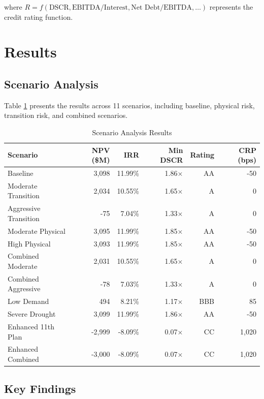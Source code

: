 \documentclass[11pt,a4paper]{article}
\begin{document}
where $R = f(\text{DSCR}, \text{EBITDA/Interest}, \text{Net Debt/EBITDA}, \dots)$ represents the credit rating function.

\section{Results}

\subsection{Scenario Analysis}

Table \ref{tab:scenarios} presents the results across 11 scenarios, including baseline, physical risk, transition risk, and combined scenarios.

\begin{table}[htbp]
\centering
\caption{Scenario Analysis Results}
\label{tab:scenarios}
\begin{tabular}{lrrrrr}
\toprule
\textbf{Scenario} & \textbf{NPV (\$M)} & \textbf{IRR} & \textbf{Min DSCR} & \textbf{Rating} & \textbf{CRP (bps)} \\
\midrule
Baseline & 3,098 & 11.99\% & 1.86× & AA & -50 \\
Moderate Transition & 2,034 & 10.55\% & 1.65× & A & 0 \\
Aggressive Transition & -75 & 7.04\% & 1.33× & A & 0 \\
Moderate Physical & 3,095 & 11.99\% & 1.85× & AA & -50 \\
High Physical & 3,093 & 11.99\% & 1.85× & AA & -50 \\
Combined Moderate & 2,031 & 10.55\% & 1.65× & A & 0 \\
Combined Aggressive & -78 & 7.03\% & 1.33× & A & 0 \\
Low Demand & 494 & 8.21\% & 1.17× & BBB & 85 \\
Severe Drought & 3,099 & 11.99\% & 1.86× & AA & -50 \\
Enhanced 11th Plan & -2,999 & -8.09\% & 0.07× & CC & 1,020 \\
Enhanced Combined & -3,000 & -8.09\% & 0.07× & CC & 1,020 \\
\bottomrule
\end{tabular}
\end{table}

\subsection{Key Findings}
\end{document}

